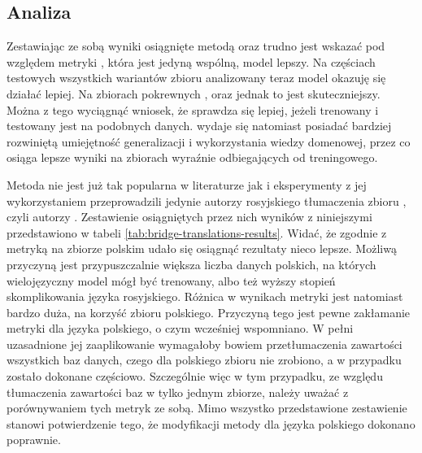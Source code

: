 \subsection{Analiza}
Zestawiając ze sobą wyniki osiągnięte metodą  oraz  trudno jest wskazać pod względem metryki , która jest jedyną wspólną, model lepszy. Na częściach testowych wszystkich wariantów zbioru  analizowany teraz model  okazuję się działać lepiej. Na zbiorach pokrewnych ,  oraz  jednak to  jest skuteczniejszy. Można z tego wyciągnąć wniosek, że  sprawdza się lepiej, jeżeli trenowany i testowany jest na podobnych danych.  wydaje się natomiast posiadać bardziej rozwiniętą umiejętność generalizacji i wykorzystania wiedzy domenowej, przez co osiąga lepsze wyniki na zbiorach wyraźnie odbiegających od treningowego. 

Metoda  nie jest już tak popularna w literaturze jak  i eksperymenty z jej wykorzystaniem przeprowadzili jedynie autorzy rosyjskiego tłumaczenia zbioru , czyli autorzy . Zestawienie osiągniętych przez nich wyników z niniejszymi przedstawiono w tabeli \ref{tab:bridge-translations-results}. Widać, że zgodnie z metryką  na zbiorze polskim udało się osiągnąć rezultaty nieco lepsze. Możliwą przyczyną jest przypuszczalnie większa liczba danych polskich, na których wielojęzyczny model  mógł być trenowany, albo też wyższy stopień skomplikowania języka rosyjskiego. Różnica w wynikach metryki  jest natomiast bardzo duża, na korzyść zbioru polskiego. Przyczyną tego jest pewne zakłamanie metryki  dla języka polskiego, o czym wcześniej wspomniano. W pełni uzasadnione jej zaaplikowanie wymagałoby bowiem przetłumaczenia zawartości wszystkich baz danych, czego dla polskiego zbioru nie zrobiono, a w przypadku  zostało dokonane częściowo. Szczególnie więc w tym przypadku, ze względu tłumaczenia zawartości baz w tylko jednym zbiorze, należy uważać z porównywaniem tych metryk ze sobą. Mimo wszystko przedstawione zestawienie stanowi potwierdzenie tego, że modyfikacji metody  dla języka polskiego dokonano poprawnie.

